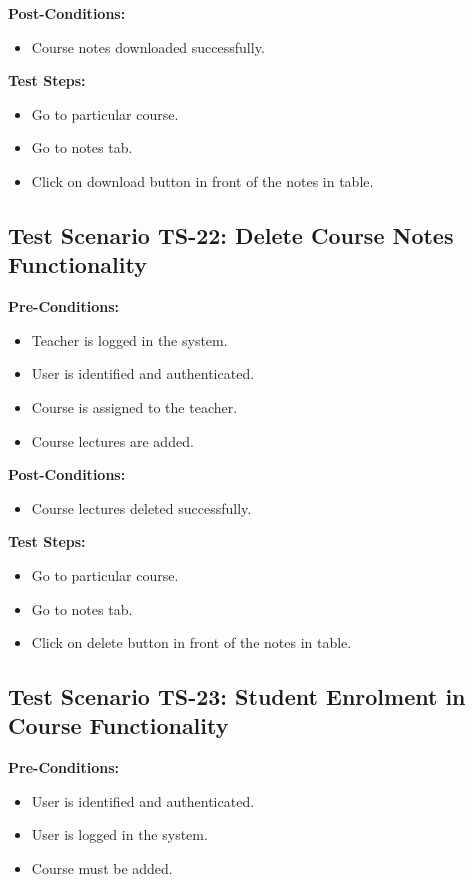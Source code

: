 \textbf{Post-Conditions: }
\begin{itemize}

\item Course notes downloaded successfully.

\end{itemize}
\textbf{Test Steps:}
\begin{itemize}

\item Go to particular course.
\item Go to notes tab.
\item Click on download button in front of the notes in table.

\end{itemize}


\subsection{Test Scenario TS-22: Delete Course Notes Functionality}
\textbf{Pre-Conditions: }
\begin{itemize}

\item Teacher is logged in the system.
\item User is identified and authenticated.
\item Course is assigned to the teacher.
\item Course lectures are added.

\end{itemize}

\textbf{Post-Conditions: }
\begin{itemize}

\item Course lectures deleted successfully.

\end{itemize}
\textbf{Test Steps:}
\begin{itemize}

\item Go to particular course.
\item Go to notes tab.
\item Click on delete button in front of the notes in table.

\end{itemize}




\subsection{Test Scenario TS-23: Student Enrolment in Course Functionality}
\textbf{Pre-Conditions: }
\begin{itemize}

\item User is identified and authenticated.
\item User is logged in the system.
\item Course must be added.

\end{itemize}

